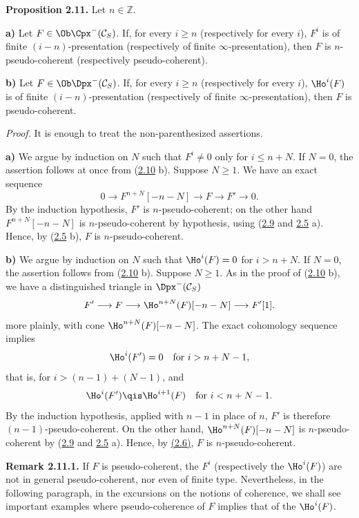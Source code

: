 \textbf{Proposition 2.11.} Let \(n\in\mathbb Z\).

\textbf{a)} Let \(F\in\Ob\Cpx^-(\mathcal C_S)\). If, for every \(i\geq n\) (respectively for every \(i\)), \(F^i\) is of finite \((i-n)\)-presentation (respectively of finite \(\infty\)-presentation), then \(F\) is \(n\)-pseudo-coherent (respectively pseudo-coherent).

\textbf{b)} Let \(F\in\Ob\Dpx^-(\mathcal C_S)\). If, for every \(i\geq n\) (respectively for every \(i\)), \(\Ho^i(F)\) is of finite \((i-n)\)-presentation (respectively of finite \(\infty\)-presentation), then \(F\) is pseudo-coherent.

\emph{Proof.} It is enough to treat the non-parenthesized assertions.

\textbf{a)} We argue by induction on \(N\) such that \(F^i\neq0\) only for \(i\leq n+N\). If \(N=0\), the assertion follows at once from (\hyperlink{sga6.e01.prop.2-10}{2.10} b). Suppose \(N\geq1\). We have an exact sequence
\[
  0\longrightarrow F^{n+N}[-n-N]\longrightarrow F\longrightarrow F'\longrightarrow 0 .
\]
By the induction hypothesis, \(F'\) is \(n\)-pseudo-coherent; on the other hand \(F^{n+N}[-n-N]\) is \(n\)-pseudo-coherent by hypothesis, using (\hyperlink{sga6.e01.prop.2-9}{2.9} and \hyperlink{sga6.e01.prop.2-5}{2.5} a). Hence, by (\hyperlink{sga6.e01.prop.2-5}{2.5} b), \(F\) is \(n\)-pseudo-coherent.

\textbf{b)} We argue by induction on \(N\) such that \(\Ho^i(F)=0\) for \(i>n+N\). If \(N=0\), the assertion follows from (\hyperlink{sga6.e01.prop.2-10}{2.10} b). Suppose \(N\geq1\). As in the proof of (\hyperlink{sga6.e01.prop.2-10}{2.10} b), we have a distinguished triangle in \(\Dpx^-(\mathcal C_S)\)
\[
  F'\longrightarrow F\longrightarrow \Ho^{n+N}(F)[-n-N]\longrightarrow F'[1].
\]
more plainly, with cone \(\Ho^{n+N}(F)[-n-N]\). The exact cohomology sequence implies
\[
  \Ho^i(F')=0\quad\text{for } i>n+N-1,
\]
that is, for \(i>(n-1)+(N-1)\), and
\[
  \Ho^i(F')\qis \Ho^{i+1}(F)\quad\text{for }i<n+N-1 .
\]
By the induction hypothesis, applied with \(n-1\) in place of \(n\), \(F'\) is therefore \((n-1)\)-pseudo-coherent. On the other hand, \(\Ho^{n+N}(F)[-n-N]\) is \(n\)-pseudo-coherent by (\hyperlink{sga6.e01.prop.2-9}{2.9} and \hyperlink{sga6.e01.prop.2-5}{2.5} a). Hence, by \hyperlink{sga6.e01.schol.2-6}{(2.6)}, \(F\) is \(n\)-pseudo-coherent.

\textbf{Remark 2.11.1.} If \(F\) is pseudo-coherent, the \(F^i\) (respectively the \(\Ho^i(F)\)) are not in general pseudo-coherent, nor even of finite type. Nevertheless, in the following paragraph, in the excursions on the notions of coherence, we shall see important examples where pseudo-coherence of \(F\) implies that of the \(\Ho^i(F)\).

